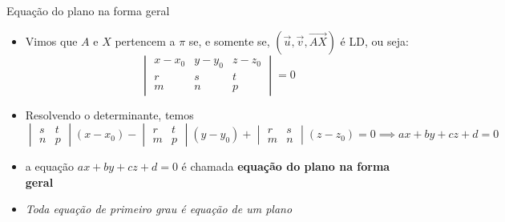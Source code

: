 \begin{frame}{Equação do plano na forma geral}
    \begin{itemize}
        \item Vimos que \(A\) e \(X\) pertencem a \(\pi\) se, e somente se, 
            \((\vec{u},\vec{v},\vec{AX})\) é LD, ou seja:
            \[
                \begin{vmatrix}
                    x-x_0 & y-y_0 & z-z_0 \\
                    r & s & t \\
                    m & n & p
                \end{vmatrix}
                =0
            \]
        \item Resolvendo o determinante, temos
            \[
                \begin{vmatrix}
                    s & t \\ n & p
                \end{vmatrix}
                (x-x_0) -
                \begin{vmatrix}
                    r & t \\ m & p
                \end{vmatrix}
                (y-y_0) +
                \begin{vmatrix}
                    r & s \\ m & n
                \end{vmatrix}
                (z-z_0) =0 \implies ax+ by +cz + d=0
            \]
        \item a equação \(ax+ by +cz + d=0\) é chamada \textbf{equação do plano na forma geral}
        \item \textit{Toda equação de primeiro grau é equação de um plano}
    \end{itemize}
\end{frame}

